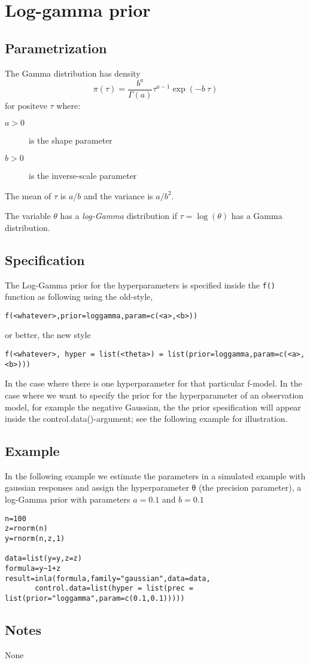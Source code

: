 \documentclass[a4paper,11pt]{article}
\begin{document}
\section*{ Log-gamma prior}

\subsection*{Parametrization}
The Gamma distribution has density
\begin{equation}
    \pi(\tau)=\frac{b^a}{\Gamma(a)}\tau^{a-1}\exp(-b\ \tau)
\end{equation}
for positeve $\tau$ where:
\begin{description}
\item[$a>0$] is the shape parameter
\item[$b>0$] is the inverse-scale parameter
\end{description}
The mean of $\tau$ is $a/b$ and the variance is $a/b^2$.

The variable $\theta$ has a {\it log-Gamma} distribution if
$\tau=\log(\theta)$ has a Gamma distribution.

\subsection*{Specification}
The Log-Gamma prior for the hyperparameters is specified inside the
{\tt f()} function as following using the old-style,
\begin{center}
    {\tt f(<whatever>,prior=loggamma,param=c(<a>,<b>))}
\end{center}
or better, the new style
\begin{center}
    {\tt f(<whatever>, hyper = list(<theta>) =
        list(prior=loggamma,param=c(<a>,<b>)))}
\end{center}
In the case where there is one hyperparameter for that particular
f-model. In the case where we want to specify the prior for the
hyperparameter of an observation model, for example the negative
Gaussian, the the prior spesification will appear inside the
control.data()-argument; see the following example for illustration.

\subsection*{Example}

In the following example we estimate the parameters in a simulated
example with gaussian responses and assign the hyperparameter θ (the
precision parameter), a log-Gamma prior with parameters $a=0.1$ and
$b=0.1$


\begin{verbatim}
n=100
z=rnorm(n)
y=rnorm(n,z,1)

data=list(y=y,z=z)
formula=y~1+z
result=inla(formula,family="gaussian",data=data,
       control.data=list(hyper = list(prec = list(prior="loggamma",param=c(0.1,0.1)))))
\end{verbatim}

\subsection*{Notes}
None
\end{document}
